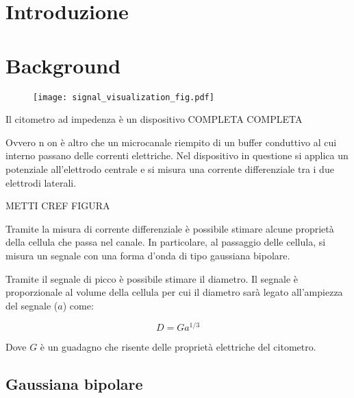 \section{Introduzione}
\textcolor{blue}{\lipsum[1-2]}

\section{Background}

\begin{figure*}
	\begin{subfigure}{0.6\linewidth}
		\centering
		\footnotesize{ \def\svgwidth{\linewidth}
	    }
		\caption{}
	\end{subfigure}\hfill
	\begin{subfigure}{0.4\linewidth}
	\centering
	\texttt{[image: signal\_visualization\_fig.pdf]}
	\caption{}
\end{subfigure}
\caption{}
\label{fig:generale}
\end{figure*}

Il citometro ad impedenza è un dispositivo COMPLETA COMPLETA

Ovvero n on è altro che un microcanale riempito di un buffer conduttivo al cui interno passano delle correnti elettriche. Nel dispositivo in questione si applica un potenziale all'elettrodo centrale e si misura una corrente differenziale tra i due elettrodi laterali.

METTI CREF FIGURA

Tramite la misura di corrente differenziale è possibile stimare alcune proprietà della cellula che passa nel canale. In particolare, al passaggio delle cellula, si misura un segnale con una forma d'onda di tipo gaussiana bipolare.

Tramite il segnale di picco è possibile stimare il diametro. Il segnale è proporzionale al volume della cellula per cui il diametro sarà legato all'ampiezza del segnale ($a$) come:


\begin{equation}
	D=G a^{1 / 3}
\end{equation}

Dove $G$ è un guadagno che risente delle proprietà elettriche del citometro.

\subsection{Gaussiana bipolare}

